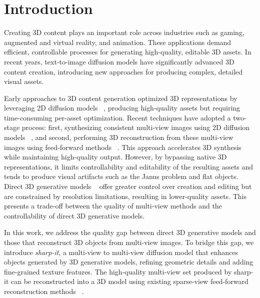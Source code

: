 \chapter{Introduction}
\label{chap:intro}


Creating 3D content plays an important role across industries such as gaming, augmented and virtual reality, and animation. These applications demand efficient, controllable processes for generating high-quality, editable 3D assets. In recent years, text-to-image diffusion models have significantly advanced 3D content creation, introducing new approaches for producing complex, detailed visual assets.

Early approaches to 3D content generation optimized 3D representations by leveraging 2D diffusion models ~\cite{poole2022dreamfusion, wang2022scorejacobianchaininglifting}, producing high-quality assets but requiring time-consuming per-asset optimization. Recent techniques have adopted a two-stage process: first, synthesizing consistent multi-view images using 2D diffusion models ~\cite{liu2023zero1to3, wang2023imagedream, shi2024mvdream, shi2023zero123singleimageconsistent, liu2023one2345, liu2023one2345++}, and second, performing 3D reconstruction from these multi-view images using feed-forward methods ~\cite{instant3d2023, xu2024instantmesh}.
This approach accelerates 3D synthesis while maintaining high-quality output. However, by bypassing native 3D representations, it limits controllability and editability of the resulting assets and tends to produce visual artifacts such as the Janus problem and flat objects. Direct 3D generative models ~\cite{jun2023shape, nichol2022pointe} offer greater control over creation and editing but are constrained by resolution limitations, resulting in lower-quality assets. This presents a trade-off between the quality of multi-view methods and the controllability of direct 3D generative models.



In this work, we address the quality gap between direct 3D generative models and those that reconstruct 3D objects from multi-view images. To bridge this gap, we introduce \emph{sharp-it}, a multi-view to multi-view diffusion model that enhances objects generated by 3D generative models, refining geometric details and adding fine-grained texture features. The high-quality multi-view set produced by sharp-it can be reconstructed into a 3D model using existing sparse-view feed-forward reconstruction methods ~\cite{xu2024instantmesh, jin2024lvsmlargeviewsynthesis, hong2023lrm, zhuang2024gtr}.

